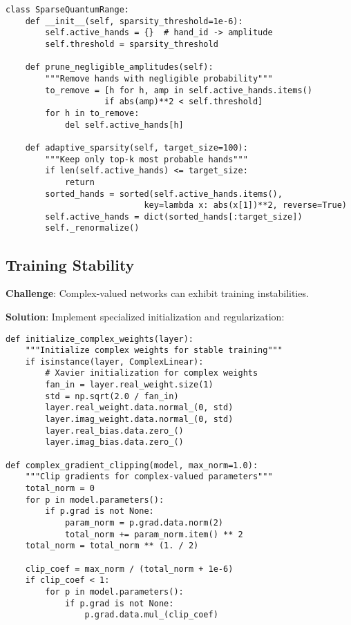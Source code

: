 \documentclass[11pt,a4paper]{article}
\begin{document}
\begin{lstlisting}
class SparseQuantumRange:
    def __init__(self, sparsity_threshold=1e-6):
        self.active_hands = {}  # hand_id -> amplitude
        self.threshold = sparsity_threshold
        
    def prune_negligible_amplitudes(self):
        """Remove hands with negligible probability"""
        to_remove = [h for h, amp in self.active_hands.items() 
                    if abs(amp)**2 < self.threshold]
        for h in to_remove:
            del self.active_hands[h]
            
    def adaptive_sparsity(self, target_size=100):
        """Keep only top-k most probable hands"""
        if len(self.active_hands) <= target_size:
            return
        sorted_hands = sorted(self.active_hands.items(), 
                            key=lambda x: abs(x[1])**2, reverse=True)
        self.active_hands = dict(sorted_hands[:target_size])
        self._renormalize()
\end{lstlisting}

\subsection{Training Stability}

\textbf{Challenge}: Complex-valued networks can exhibit training instabilities.

\textbf{Solution}: Implement specialized initialization and regularization:

\begin{lstlisting}
def initialize_complex_weights(layer):
    """Initialize complex weights for stable training"""
    if isinstance(layer, ComplexLinear):
        # Xavier initialization for complex weights
        fan_in = layer.real_weight.size(1)
        std = np.sqrt(2.0 / fan_in)
        layer.real_weight.data.normal_(0, std)
        layer.imag_weight.data.normal_(0, std)
        layer.real_bias.data.zero_()
        layer.imag_bias.data.zero_()

def complex_gradient_clipping(model, max_norm=1.0):
    """Clip gradients for complex-valued parameters"""
    total_norm = 0
    for p in model.parameters():
        if p.grad is not None:
            param_norm = p.grad.data.norm(2)
            total_norm += param_norm.item() ** 2
    total_norm = total_norm ** (1. / 2)
    
    clip_coef = max_norm / (total_norm + 1e-6)
    if clip_coef < 1:
        for p in model.parameters():
            if p.grad is not None:
                p.grad.data.mul_(clip_coef)
\end{lstlisting}
\end{document}
